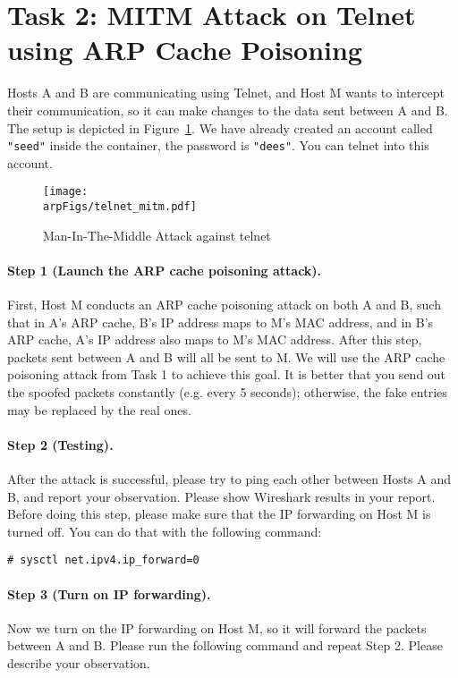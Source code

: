 \section{Task 2: MITM Attack on Telnet using ARP Cache Poisoning}

Hosts A and B are communicating using Telnet, and Host M wants to intercept their
communication, so it can make changes to the data sent between A and B. The setup is depicted
in Figure~\ref{arp:fig:telnet_mitm}. We have already created an account called
\texttt{"seed"} inside the container, the password is \texttt{"dees"}. You can 
telnet into this account. 

\begin{figure}
    \centering
    \texttt{[image: \\arpFigs/telnet\_mitm.pdf]}
    \caption{Man-In-The-Middle Attack against telnet}
    \label{arp:fig:telnet_mitm}
\end{figure}


\paragraph{Step 1 (Launch the ARP cache poisoning attack).} First, Host M conducts an ARP cache
poisoning attack on both A and B, such that in A's ARP cache, B's IP address maps to M's MAC
address, and in B's ARP cache, A's IP address also maps to M's MAC address. After this step,
packets sent between A and B will all be sent to M. We will use the ARP cache poisoning attack
from Task 1 to achieve this goal. It is better that you send out the spoofed packets
constantly (e.g. every 5 seconds); otherwise, the fake entries may be replaced by 
the real ones. 



\paragraph{Step 2 (Testing).} After the attack is successful, please try to ping each other
between Hosts A and B, and report your observation. Please show Wireshark results in your
report. Before doing this step, please make sure that the IP forwarding on Host M is turned
off. You can do that with the following command:

\begin{lstlisting}
# sysctl net.ipv4.ip_forward=0
\end{lstlisting}

\paragraph{Step 3 (Turn on IP forwarding).} Now we turn on the IP forwarding on Host M, so it
will forward the packets between A and B. Please run the following command and repeat Step 2.
Please describe your observation. 

